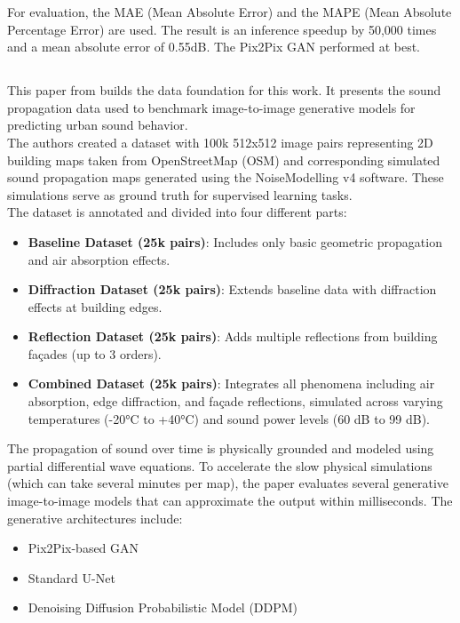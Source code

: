 			For evaluation, the MAE (Mean Absolute Error) and the MAPE (Mean Absolute Percentage Error) are used. The result is an inference speedup by 50{,}000 times and a mean absolute error of 0.55dB. The Pix2Pix GAN performed at best.
		
		\subsection{}
			This paper from \citeauthor{spitznagel_urban_2024-1} builds the data foundation for this work. It presents the sound propagation data used to benchmark image-to-image generative models for predicting urban sound behavior.\\
			The authors created a dataset with 100k 512x512 image pairs representing 2D building maps taken from OpenStreetMap (OSM) and corresponding simulated sound propagation maps generated using the NoiseModelling v4 software. These simulations serve as ground truth for supervised learning tasks.\\
			The dataset is annotated and divided into four different parts:
			\begin{itemize}[itemsep=1mm, parsep=0pt]
				\item \textbf{Baseline Dataset (25k pairs)}: Includes only basic geometric propagation and air absorption effects.
				\item \textbf{Diffraction Dataset (25k pairs)}: Extends baseline data with diffraction effects at building edges.
				\item \textbf{Reflection Dataset (25k pairs)}: Adds multiple reflections from building façades (up to 3 orders).
				\item \textbf{Combined Dataset (25k pairs)}: Integrates all phenomena including air absorption, edge diffraction, and façade reflections, simulated across varying temperatures (-20°C to +40°C) and sound power levels (60 dB to 99 dB).
			\end{itemize}
			The propagation of sound over time is physically grounded and modeled using partial differential wave equations.
			\clearpage
			To accelerate the slow physical simulations (which can take several minutes per map), the paper evaluates several generative image-to-image models that can approximate the output within milliseconds. 
			The generative architectures include:
			\begin{itemize}[itemsep=1mm, parsep=0pt]
				\item Pix2Pix-based GAN
				\item Standard U-Net
				\item Denoising Diffusion Probabilistic Model (DDPM)
			\end{itemize}
